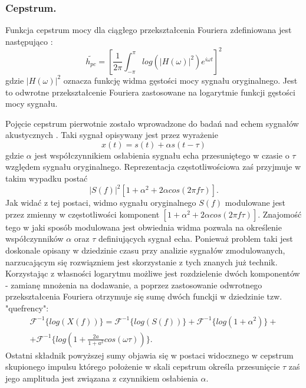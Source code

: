 \subsubsection{Cepstrum.}

Funkcja cepstrum mocy dla ciągłego przekształcenia Fouriera zdefiniowana jest następująco \cite{fosr}:
\begin{equation}
    \tilde{h_{pc}} = \left[\frac{1}{2\pi}\int_{-\pi}^{\pi}log\left(| H(\omega)  |^2\right)e^{i \omega t}\right]^2
\end{equation}
gdzie $ |H(\omega)|^2 $ oznacza funkcję widma gęstości mocy sygnału oryginalnego. Jest to odwrotne przekształcenie Fouriera zastosowane na logarytmie funkcji gęstości mocy sygnału.

Pojęcie cepstrum pierwotnie zostało wprowadzone do badań nad echem sygnałów akustycznych \cite{hdsp}. Taki sygnał opisywany jest przez wyrażenie 
\begin{equation}
     x(t) = s(t) + \alpha s(t - \tau) 
\end{equation} 
gdzie $ \alpha $ jest współczynnikiem osłabienia sygnału echa przesuniętego w czasie o $ \tau $ względem sygnału oryginalnego. Reprezentacja częstotliwościowa zaś przyjmuje w takim wypadku postać 
\begin{equation}
    |S(f)|^2\left[ 1+ \alpha^2+2\alpha cos(2\pi f\tau)\right].
\end{equation}
Jak widać z tej postaci, widmo sygnału oryginalnego $S(f)$ modulowane jest przez zmienny w częstotliwości komponent $[1 + \alpha^2 + 2\alpha cos(2\pi f \tau)]$. Znajomość tego w jaki sposób modulowana jest obwiednia widma pozwala na określenie współczynników $\alpha$  oraz $\tau$ definiujących sygnał echa. Ponieważ problem taki jest doskonale opisany w dziedzinie czasu przy analizie sygnałów zmodulowanych, narzucającym się rozwiązniem jest skorzystanie z tych znanych już technik. Korzystając z własności logarytmu możliwe jest rozdzielenie dwóch komponentów - zamianę mnożenia na dodawanie, a poprzez zastosowanie odwrotnego przekształcenia Fouriera otrzymuje się sumę dwóch funckji w dziedzinie tzw. "quefrency": 
\begin{equation}
    \begin{split}
    \mathcal{F}^{-1}\{log(X(f))\} =   \mathcal{F}^{-1}\{log(S(f))\} + \mathcal{F}^{-1}\{log(1+\alpha^2)\} + \\ + \mathcal{F}^{-1}\{log(1+\frac{2a}{1+a^2} cos(\omega \tau))\}.
    \end{split}
\end{equation}
Ostatni składnik powyższej sumy objawia się w postaci widocznego w cepstrum skupionego impulsu którego położenie w skali cepstrum określa przesunięcie $\tau$ zaś jego amplituda jest związana z czynnikiem osłabienia $\alpha$. 

